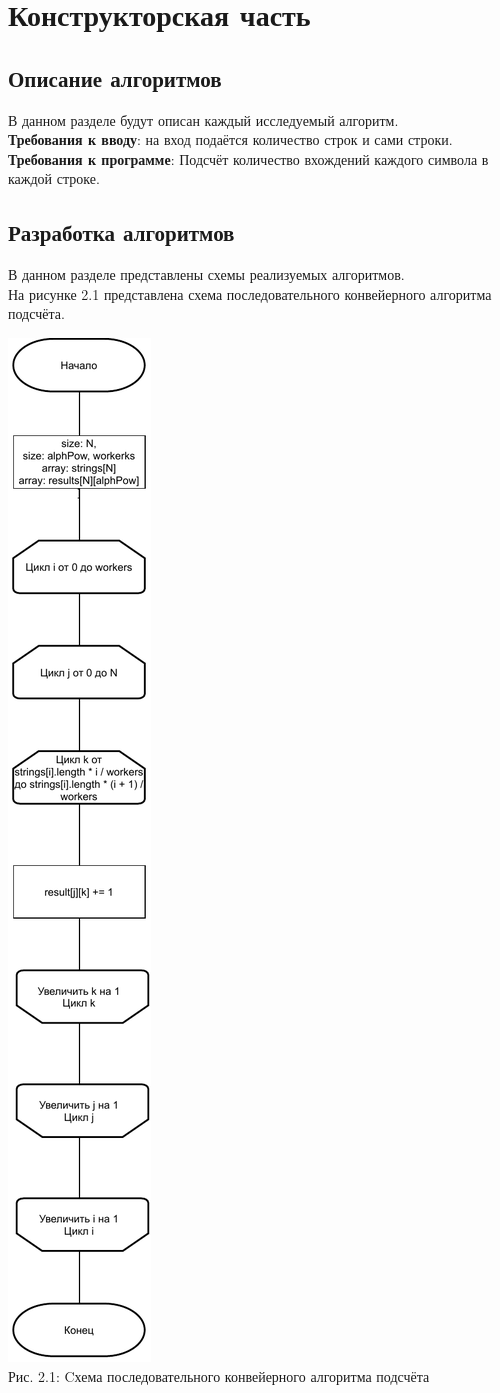 \documentclass[12pt,a4paper]{article}
\numberwithin{equation}{section}
\begin{document}
\section{Конструкторская часть}
\subsection{Описание алгоритмов}
\qquad В данном разделе будут описан каждый исследуемый алгоритм.\\

\textbf{Требования к вводу}: на вход подаётся количество строк и сами строки.\\
\textbf{Требования к программе}: Подсчёт количество вхождений каждого символа в каждой строке.


\clearpage
\subsection{Разработка алгоритмов} %
В данном разделе представлены схемы реализуемых алгоритмов.\\
На рисунке 2.1 представлена схема последовательного конвейерного алгоритма подсчёта.\\
\begin{center}	
	\includegraphics[width=.18\linewidth]{src/schemas/consistent}\\
	Рис. 2.1: Cхема последовательного конвейерного алгоритма подсчёта
\end{center}
\end{document}
